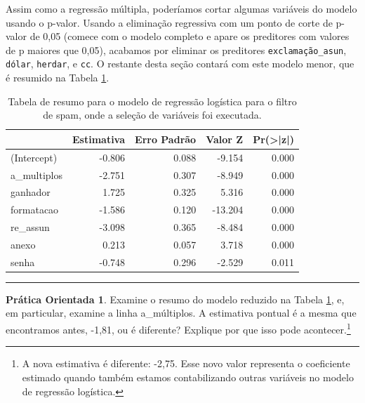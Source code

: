 \documentclass[
]{book}
\theoremstyle{definition}
\theoremstyle{definition}
\theoremstyle{definition}
\newtheorem{exercise}{Prática Orientada}[chapter]
\theoremstyle{definition}
\theoremstyle{remark}
\begin{document}
Assim como a regressão múltipla, poderíamos cortar algumas variáveis do modelo usando o p-valor. Usando a eliminação regressiva com um ponto de corte de p-valor de 0,05 (comece com o modelo completo e apare os preditores com valores de p maiores que 0,05), acabamos por eliminar os preditores \texttt{exclamação\_asun}, \texttt{dólar}, \texttt{herdar}, e \texttt{cc}. O restante desta seção contará com este modelo menor, que é resumido na Tabela \ref{tab:emailLogisticReducedModel}.

\begin{table}

\caption{\label{tab:emailLogisticReducedModel}Tabela de resumo para o modelo de regressão logística para o filtro de spam, onde a seleção de variáveis foi executada.}
\centering
\begin{tabular}[t]{l|r|r|r|r}
\hline
  & Estimativa & Erro Padrão & Valor Z & Pr(>|z|)\\
\hline
(Intercept) & -0.806 & 0.088 & -9.154 & 0.000\\
\hline
a\_multiplos & -2.751 & 0.307 & -8.949 & 0.000\\
\hline
ganhador & 1.725 & 0.325 & 5.316 & 0.000\\
\hline
formatacao & -1.586 & 0.120 & -13.204 & 0.000\\
\hline
re\_assun & -3.098 & 0.365 & -8.484 & 0.000\\
\hline
anexo & 0.213 & 0.057 & 3.718 & 0.000\\
\hline
senha & -0.748 & 0.296 & -2.529 & 0.011\\
\hline
\end{tabular}
\end{table}

\begin{center}\rule{0.5\linewidth}{0.5pt}\end{center}

\begin{exercise}
\protect\hypertarget{exr:unnamed-chunk-298}{}{\label{exr:unnamed-chunk-298} }Examine o resumo do modelo reduzido na Tabela \ref{tab:emailLogisticReducedModel}, e, em particular, examine a linha a\_múltiplos. A estimativa pontual é a mesma que encontramos antes, -1,81, ou é diferente? Explique por que isso pode acontecer.\footnote{A nova estimativa é diferente: -2,75. Esse novo valor representa o coeficiente estimado quando também estamos contabilizando outras variáveis no modelo de regressão logística.}
\end{exercise}
\end{document}
